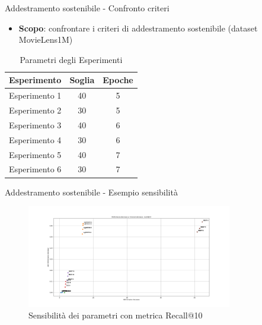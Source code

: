 \begin{frame}{Addestramento sostenibile - Confronto criteri}
    \begin{itemize}
        \item \textbf{Scopo}: confrontare i criteri di addestramento sostenibile (dataset MovieLens1M)
    \end{itemize}
    \begin{table}[]
        \centering
        \begin{tabular}{|c|c|c|}
            \hline
            \textbf{Esperimento} & \textbf{Soglia} & \textbf{Epoche} \\ \hline
            Esperimento 1 & 40 & 5 \\ \hline
            Esperimento 2 & 30 & 5 \\ \hline
            Esperimento 3 & 40 & 6 \\ \hline
            Esperimento 4 & 30 & 6 \\ \hline
            Esperimento 5 & 40 & 7 \\ \hline
            Esperimento 6 & 30 & 7 \\ \hline
        \end{tabular}
        \caption{Parametri degli Esperimenti}
    \end{table}
\end{frame}



\begin{frame}{Addestramento sostenibile - Esempio sensibilità}
    \begin{figure}[H]
        \centering
        \includegraphics[width=0.8\textwidth]{images/sensibility_recall@10.png}
        \caption{Sensibilità dei parametri con metrica Recall@10}
    \end{figure}
\end{frame}


